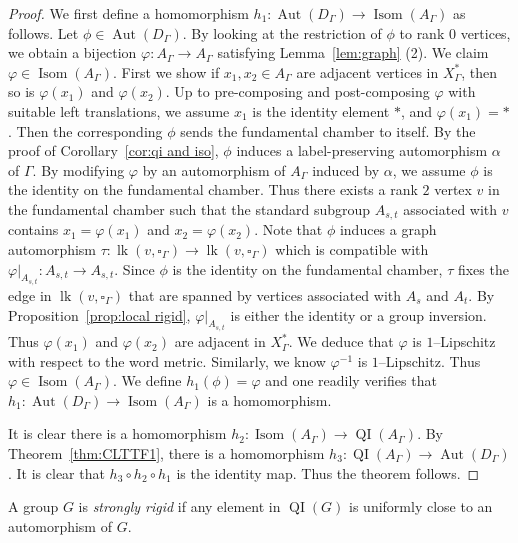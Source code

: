 \documentclass[11pt]{amsart}
\newcommand{\lk}{\operatorname{lk}}
\newcommand{\QI}{\operatorname{QI}}
\newcommand{\Isom}{\operatorname{Isom}}
\newcommand{\Aut}{\operatorname{Aut}}
\theoremstyle{definition}
\newcommand{\Xa}{X^{\ast}}
\begin{document}
\begin{proof}
We first define a homomorphism $h_1\colon \Aut(D_\Gamma)\to \Isom(A_\Gamma)$ as follows. Let $\phi\in \Aut(D_\Gamma)$. By looking at the restriction of $\phi$ to rank $0$ vertices, we obtain a bijection $\varphi\colon A_\Gamma\to A_\Gamma$ satisfying Lemma~\ref{lem:graph} (2). We claim $\varphi\in \Isom(A_\Gamma)$. First we show if $x_1,x_2\in A_\Gamma$ are adjacent vertices in $\Xa_\Gamma$, then so is $\varphi(x_1)$ and $\varphi(x_2)$. Up to pre-composing and post-composing $\varphi$ with suitable left translations, we assume $x_1$ is the identity element $\ast$, and $\varphi(x_1)=\ast$. Then the corresponding $\phi$ sends the fundamental chamber to itself. By the proof of Corollary~\ref{cor:qi and iso}, $\phi$ induces a label-preserving automorphism $\alpha$ of $\Gamma$. By modifying $\varphi$ by an automorphism of $A_\Gamma$ induced by $\alpha$, we assume $\phi$ is the identity on the fundamental chamber. Thus there exists a rank $2$ vertex $v$ in the fundamental chamber such that the standard subgroup $A_{s,t}$ associated with $v$ contains $x_1=\varphi(x_1)$ and $x_2=\varphi(x_2)$. Note that $\phi$ induces a graph automorphism $\tau\colon \lk(v,\square_\Gamma)\to\lk(v,\square_\Gamma)$ which is compatible with $\varphi|_{A_{s,t}}\colon A_{s,t}\to A_{s,t}$. Since $\phi$ is the identity on the fundamental chamber, $\tau$ fixes the edge in $\lk(v,\square_\Gamma)$ that are spanned by vertices associated with $A_s$ and $A_t$. By Proposition~\ref{prop:local rigid}, $\varphi|_{A_{s,t}}$ is either the identity or a group inversion. Thus $\varphi(x_1)$ and $\varphi(x_2)$ are adjacent in $\Xa_\Gamma$. We deduce that $\varphi$ is $1$--Lipschitz with respect to the word metric. Similarly, we know $\varphi^{-1}$ is $1$--Lipschitz. Thus $\varphi\in \Isom(A_\Gamma)$. We define $h_1(\phi)=\varphi$ and one readily verifies that $h_1\colon \Aut(D_\Gamma)\to \Isom(A_\Gamma)$ is a homomorphism.

It is clear there is a homomorphism $h_2\colon \Isom(A_\Gamma)\to\QI(A_\Gamma)$. By Theorem~\ref{thm:CLTTF1}, there is a homomorphism $h_3\colon \QI(A_\Gamma)\to \Aut(D_\Gamma)$. It is clear that $h_3\circ h_2\circ h_1$ is the identity map. Thus the theorem follows.
\end{proof}

A group $G$ is \emph{strongly rigid} if any element in $\QI(G)$ is uniformly close to an automorphism of $G$.
\end{document}
